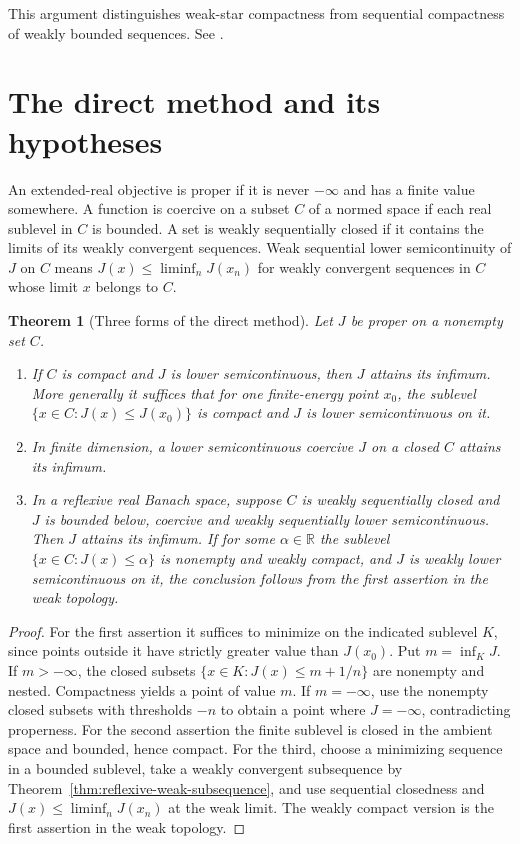 \documentclass[11pt,oneside,openany]{book}
\newcommand{\R}{\mathbb R}
\theoremstyle{plain}
\newtheorem{theorem}{Theorem}[chapter]
\theoremstyle{definition}
\theoremstyle{remark}
\begin{document}
This argument distinguishes weak-star compactness from sequential
compactness of weakly bounded sequences. See
\cite[Theorems 3.16--3.18 and Section 3.6]{Brezis}.

\section{The direct method and its hypotheses}
\label{v03-02}

An extended-real objective is proper if it is never \(-\infty\) and has
a finite value somewhere. A function is coercive on a subset \(C\) of a
normed space if each real sublevel in \(C\) is bounded. A set is weakly
sequentially closed if it contains the limits of its weakly convergent
sequences. Weak sequential lower semicontinuity of \(J\) on \(C\) means
\(J(x)\le\liminf_n J(x_n)\) for weakly convergent sequences in \(C\)
whose limit \(x\) belongs to \(C\).

\begin{theorem}[Three forms of the direct method]
\label{thm:direct-method}
Let \(J\) be proper on a nonempty set \(C\).
\begin{enumerate}
\item If \(C\) is compact and \(J\) is lower semicontinuous, then \(J\)
attains its infimum. More generally it suffices that for one
finite-energy point \(x_0\), the sublevel
\(\{x\in C:J(x)\le J(x_0)\}\) is compact and \(J\) is lower
semicontinuous on it.
\item In finite dimension, a lower semicontinuous coercive \(J\) on a
closed \(C\) attains its infimum.
\item In a reflexive real Banach space, suppose \(C\) is weakly
sequentially closed and \(J\) is bounded below, coercive and weakly
sequentially lower semicontinuous. Then \(J\) attains its infimum.
If for some \(\alpha\in\R\) the sublevel \(\{x\in C:J(x)\le\alpha\}\)
is nonempty and weakly compact, and \(J\) is weakly lower semicontinuous
on it, the conclusion follows from the first assertion in the weak topology.
\end{enumerate}
\end{theorem}
\begin{proof}
For the first assertion it suffices to minimize on the indicated sublevel
\(K\), since points outside it have strictly greater value than \(J(x_0)\).
Put \(m=\inf_K J\). If \(m>-\infty\), the closed subsets
\(\{x\in K:J(x)\le m+1/n\}\) are nonempty and nested. Compactness yields a
point of value \(m\). If \(m=-\infty\), use the nonempty closed subsets
with thresholds \(-n\) to obtain a point where \(J=-\infty\), contradicting
properness. For the second assertion the finite sublevel is closed in the
ambient space and bounded, hence compact. For the third, choose a
minimizing sequence in a bounded sublevel, take a weakly convergent
subsequence by Theorem~\ref{thm:reflexive-weak-subsequence}, and use
sequential closedness and \(J(x)\le\liminf_n J(x_n)\) at the weak limit.
The weakly compact version is the first assertion in the weak topology.
\end{proof}
\end{document}
